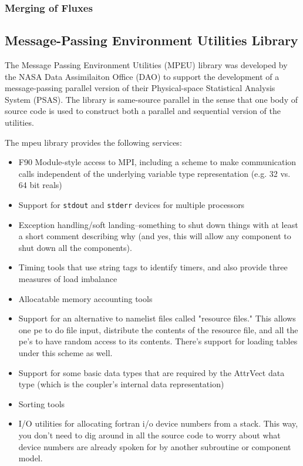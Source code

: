 \documentclass{article}
\begin{document}
\subsubsection{Merging of Fluxes}

\subsection{Message-Passing Environment Utilities Library}

The Message Passing Environment Utilities (MPEU) library was
developed by the NASA Data Assimilaiton Office (DAO) to support
the development of a message-passing parallel version of their
Physical-space Statistical Analysis System (PSAS).  The library
is same-source parallel in the sense that one body of source code
is used to construct both a parallel and sequential version of
the utilities.

The mpeu library provides the following services:
\begin{itemize}
\item F90 Module-style access to MPI, including a scheme to make
communication calls independent of the underlying variable type
representation (e.g. 32 vs. 64 bit reals)
\item Support for {\tt stdout} and {\tt stderr} devices for multiple processors
\item Exception handling/soft landing--something to shut down things
with at least a short comment describing why  (and yes, this will
allow any component to shut down all the components).
\item Timing tools that use string tags to identify timers, and also provide
three measures of load imbalance
\item Allocatable memory accounting tools
\item Support for an alternative to namelist files called
"resource files."  This allows one pe to do file input,
distribute the contents of the resource file, and all the pe's to
have random access to its contents.  There's support for loading
tables under this scheme as well.
\item Support for some basic data types that are required by the
AttrVect data type (which is the coupler's internal data
representation)
\item Sorting tools
\item I/O utilities for allocating fortran i/o device numbers from
a stack.  This way, you don't need to dig around in all the source
code to worry about what device numbers are already spoken for by
another subroutine or component model.
\end{itemize}
\end{document}
